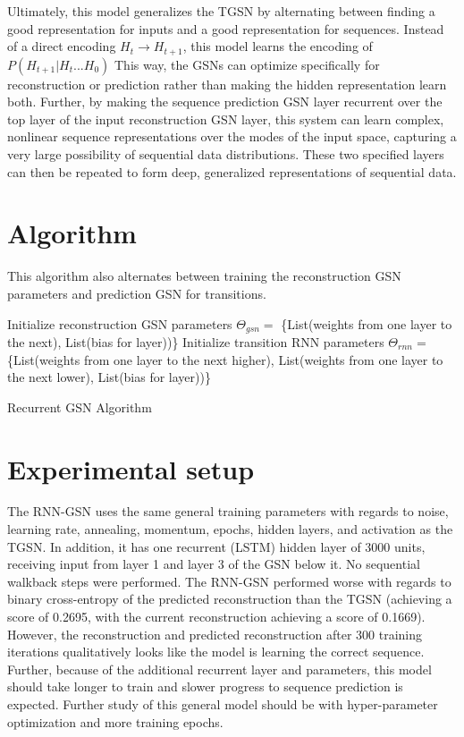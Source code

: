Ultimately, this model generalizes the TGSN by alternating between finding a good representation for inputs and a good representation for sequences. Instead of a direct encoding \(H_{t} \rightarrow H_{t+1}\), this model learns the encoding of \(P(H_{t+1}|H_{t}...H_{0})\) This way, the GSNs can optimize specifically for reconstruction or prediction rather than making the hidden representation learn both. Further, by making the sequence prediction GSN layer recurrent over the top layer of the input reconstruction GSN layer, this system can learn complex, nonlinear sequence representations over the modes of the input space, capturing a very large possibility of sequential data distributions. These two specified layers can then be repeated to form deep, generalized representations of sequential data.

\section{Algorithm}
This algorithm also alternates between training the reconstruction GSN parameters and prediction GSN for transitions.
 \begin{algorithm}[h!]
	Initialize reconstruction GSN parameters \(\Theta_{gsn} = \) \{List(weights from one layer to the next), List(bias for layer))\}\;
	Initialize transition RNN parameters \(\Theta_{rnn} = \) \{List(weights from one layer to the next higher), List(weights from one layer to the next lower), List(bias for layer))\}\;
	\caption{ Recurrent GSN Algorithm }
\end{algorithm}


\section{Experimental setup}
The RNN-GSN uses the same general training parameters with regards to noise, learning rate, annealing, momentum, epochs, hidden layers, and activation as the TGSN. In addition, it has one recurrent (LSTM) hidden layer of 3000 units, receiving input from layer 1 and layer 3 of the GSN below it. No sequential walkback steps were performed. The RNN-GSN performed worse with regards to binary cross-entropy of the predicted reconstruction than the TGSN (achieving a score of 0.2695, with the current reconstruction achieving a score of 0.1669). However, the reconstruction and predicted reconstruction after 300 training iterations qualitatively looks like the model is learning the correct sequence. Further, because of the additional recurrent layer and parameters, this model should take longer to train and slower progress to sequence prediction is expected. Further study of this general model should be with hyper-parameter optimization and more training epochs.

